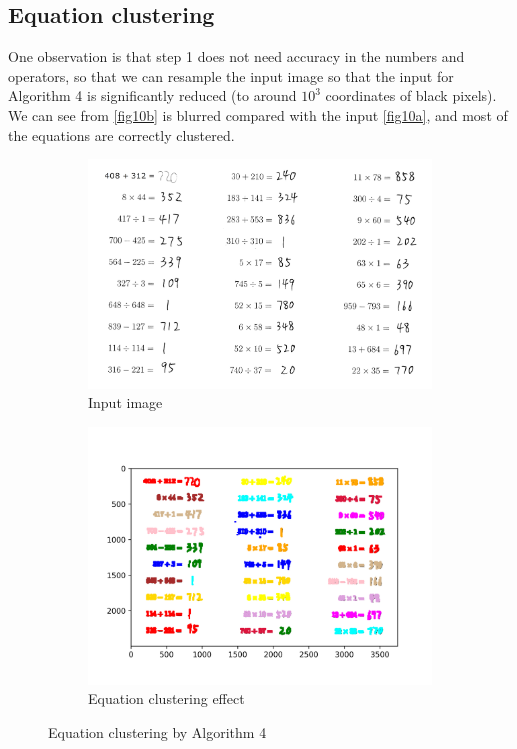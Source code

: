\subsection{Equation clustering}
One observation is that step 1 does not need accuracy in the numbers and operators, so that we can resample the input image so that the input for Algorithm 4 is significantly reduced (to around \(10^3\) coordinates of black pixels). We can see from \autoref{fig10b} is blurred compared with the input \autoref{fig10a}, and most of the equations are correctly clustered.
\begin{figure}[htbp]
    \vspace{-1em}
    \centering
    \begin{subfigure}[t]{0.8\textwidth}
        \includegraphics[width=\textwidth]{../TestSamplePictures/test1.png}
        \caption{Input image}\label{fig10a}		
    \end{subfigure}
    \begin{subfigure}[t]{0.8\textwidth}
        \includegraphics[width=\textwidth]{../TestSamplePictures/test_result.png}
        \caption{Equation clustering effect}\label{fig10b}
    \end{subfigure}
    \caption{Equation clustering by Algorithm 4}\label{fig10}
\end{figure}

